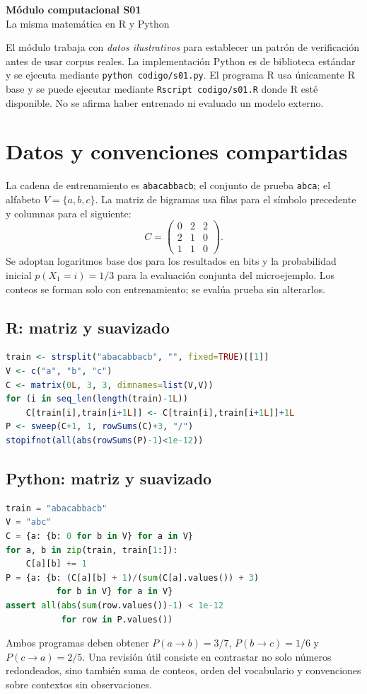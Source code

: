 \documentclass[11pt,a4paper]{report}
\begin{document}
\begin{center}{\LARGE\bfseries Módulo computacional S01}\\[4pt]
{\large La misma matemática en R y Python}\end{center}
\begin{idea}
El módulo trabaja con \emph{datos ilustrativos} para establecer un patrón de
verificación antes de usar corpus reales. La implementación Python es de
biblioteca estándar y se ejecuta mediante \texttt{python codigo/s01.py}.
El programa R usa únicamente R base y se puede ejecutar mediante
\texttt{Rscript codigo/s01.R} donde R esté disponible. No se afirma haber
entrenado ni evaluado un modelo externo.
\end{idea}
\tableofcontents\clearpage

\chapter{Datos y convenciones compartidas}
La cadena de entrenamiento es \texttt{abacabbacb}; el conjunto de prueba
\texttt{abca}; el alfabeto $V=\{a,b,c\}$. La matriz de bigramas usa
filas para el símbolo precedente y columnas para el siguiente:
\[
C=\begin{pmatrix}0&2&2\\2&1&0\\1&1&0\end{pmatrix}.
\]
Se adoptan logaritmos base dos para los resultados en bits y la
probabilidad inicial $p(X_1=i)=1/3$ para la evaluación conjunta del
microejemplo. Los conteos se forman solo con entrenamiento; se evalúa
prueba sin alterarlos.
\section{R: matriz y suavizado}
\begin{lstlisting}[language=R]
train <- strsplit("abacabbacb", "", fixed=TRUE)[[1]]
V <- c("a", "b", "c")
C <- matrix(0L, 3, 3, dimnames=list(V,V))
for (i in seq_len(length(train)-1L))
    C[train[i],train[i+1L]] <- C[train[i],train[i+1L]]+1L
P <- sweep(C+1, 1, rowSums(C)+3, "/")
stopifnot(all(abs(rowSums(P)-1)<1e-12))
\end{lstlisting}
\section{Python: matriz y suavizado}
\begin{lstlisting}[language=Python]
train = "abacabbacb"
V = "abc"
C = {a: {b: 0 for b in V} for a in V}
for a, b in zip(train, train[1:]):
    C[a][b] += 1
P = {a: {b: (C[a][b] + 1)/(sum(C[a].values()) + 3)
          for b in V} for a in V}
assert all(abs(sum(row.values())-1) < 1e-12
           for row in P.values())
\end{lstlisting}
Ambos programas deben obtener
$P(a\to b)=3/7$, $P(b\to c)=1/6$ y $P(c\to a)=2/5$.
Una revisión útil consiste en contrastar no solo números redondeados,
sino también suma de conteos, orden del vocabulario y convenciones
sobre contextos sin observaciones.
\end{document}
